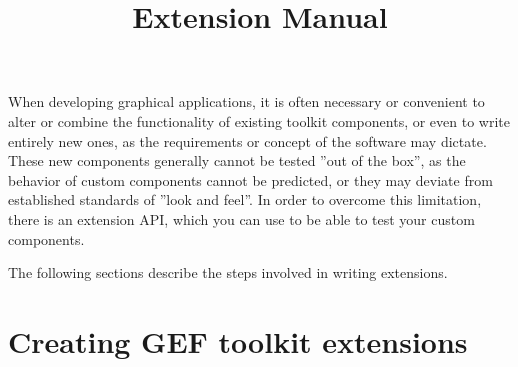 
%
\title{Extension Manual}
\maketitle

\setcounter{tocdepth}{2}
\tableofcontents
\renewcommand{\bxcomment}[2]{}%
\clearpage

\setcounter{secnumdepth}{2}

When developing graphical applications, it is often necessary or
convenient to alter or combine the functionality of existing toolkit
components, or even to write entirely new ones, as the requirements or
concept of the software may dictate. These new components
generally cannot be tested ''out of the box'', as the
behavior of custom components cannot be predicted, or they may deviate
from established standards of ''look and feel''. In order to overcome this limitation, there is an extension
API, which you can use to be able to test your custom components.

The following sections describe the steps involved in writing extensions.

\clearpage



\clearpage

\chapter{Creating GEF toolkit extensions}


\clearpage



